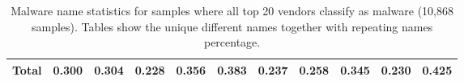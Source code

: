 \documentclass{llncs}
\begin{document}
\begin{landscape}
\begin{table}
{\begin{tabular}{rcccccccccc}
				\midrule
				Total          &     0.300 &      0.304 &     0.228 &     0.356 &     0.383 &     0.237 &     0.258 &      0.345 &              0.230 &     0.425 \\
				\bottomrule
			\end{tabular}
		}
	\caption{Malware name statistics for samples where all top 20 vendors classify as malware (10,868 samples). Tables show the unique different names together with repeating names percentage.}
	\label{tab:statistics}	
	\end{table}
\end{landscape}


\clearpage
\nocite{*}
{}

\end{document}
